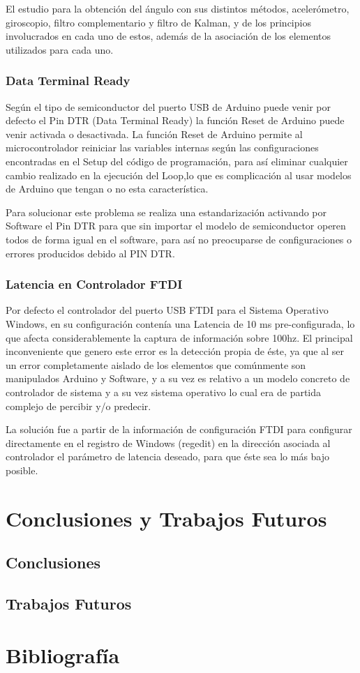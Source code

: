\documentclass[12pt,a4paper]{article}
\begin{document}
El estudio para la obtención del ángulo con sus distintos métodos, acelerómetro, giroscopio, filtro complementario y filtro de Kalman, y de los principios involucrados en cada uno de estos, además de la asociación de los elementos utilizados para cada uno.



\subsubsection{Data Terminal Ready}
Según el tipo de semiconductor del puerto USB de Arduino puede venir por defecto el Pin DTR (Data Terminal Ready) la función Reset de Arduino puede venir activada o desactivada. 
La función Reset de Arduino permite al microcontrolador reiniciar las variables internas según las configuraciones encontradas en el Setup del código de programación, para así eliminar cualquier cambio realizado en la ejecución del Loop,lo que es complicación al usar modelos de Arduino que tengan o no esta característica.

Para solucionar este problema se realiza una estandarización activando por Software el Pin DTR para que sin importar el modelo de semiconductor operen todos de forma igual en el software, para así no preocuparse de configuraciones o errores producidos debido al PIN DTR.

\subsubsection{Latencia en Controlador FTDI}
Por defecto el controlador del puerto USB FTDI para el Sistema Operativo Windows, en su configuración contenía una Latencia de 10 ms pre-configurada, lo que afecta considerablemente la captura de información sobre 100hz. El principal inconveniente que genero este error es la detección propia de éste, ya que al ser un error completamente aislado de los elementos que comúnmente son manipulados Arduino y Software, y a su vez es relativo a un modelo concreto de controlador de sistema y a su vez sistema operativo lo cual era de partida complejo de percibir y/o predecir.

La solución fue a partir de la información de configuración FTDI\cite{FTDI} para configurar directamente  en el registro de Windows (regedit) en la dirección asociada al controlador el parámetro de latencia deseado, para que éste sea lo más bajo posible.

\section{Conclusiones y Trabajos Futuros}
\subsection{Conclusiones}

\subsection{Trabajos Futuros}

\section{Bibliografía}
\printbibliography[heading=none]
\end{document}
